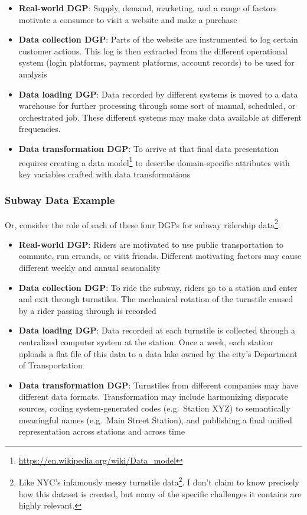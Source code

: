 \documentclass[
]{krantz}
\providecommand{\tightlist}{%
  \setlength{\itemsep}{0pt}\setlength{\parskip}{0pt}}
\renewcommand{\href}[2]{#2\footnote{\url{#1}}}
\begin{document}
\begin{itemize}
\tightlist
\item
  \textbf{Real-world DGP}: Supply, demand, marketing, and a range of factors motivate a consumer to visit a website and make a purchase
\item
  \textbf{Data collection DGP}: Parts of the website are instrumented to log certain customer actions. This log is then extracted from the different operational system (login platforms, payment platforms, account records) to be used for analysis
\item
  \textbf{Data loading DGP}: Data recorded by different systems is moved to a data warehouse for further processing through some sort of manual, scheduled, or orchestrated job. These different systems may make data available at different frequencies.
\item
  \textbf{Data transformation DGP}: To arrive at that final data presentation requires creating a \href{https://en.wikipedia.org/wiki/Data_model}{data model} to describe domain-specific attributes with key variables crafted with data transformations
\end{itemize}

\hypertarget{subway-data-example}{%
\subsubsection{Subway Data Example}\label{subway-data-example}}

Or, consider the role of each of these four DGPs for subway ridership data\footnote{Like NYC's infamously messy \href{http://web.mta.info/developers/turnstile.html}{turnstile data}. I don't claim to know precisely how this dataset is created, but many of the specific challenges it contains are highly relevant.}:

\begin{itemize}
\tightlist
\item
  \textbf{Real-world DGP}: Riders are motivated to use public transportation to commute, run errands, or visit friends. Different motivating factors may cause different weekly and annual seasonality
\item
  \textbf{Data collection DGP}: To ride the subway, riders go to a station and enter and exit through turnstiles. The mechanical rotation of the turnstile caused by a rider passing through is recorded
\item
  \textbf{Data loading DGP}: Data recorded at each turnstile is collected through a centralized computer system at the station. Once a week, each station uploads a flat file of this data to a data lake owned by the city's Department of Transportation
\item
  \textbf{Data transformation DGP}: Turnstiles from different companies may have different data formats. Transformation may include harmonizing disparate sources, coding system-generated codes (e.g.~Station XYZ) to semantically meaningful names (e.g.~Main Street Station), and publishing a final unified representation across stations and across time
\end{itemize}
\end{document}

